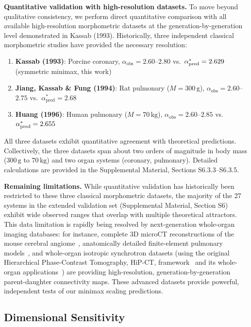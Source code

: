 \textbf{Quantitative validation with high-resolution datasets.} To move beyond
qualitative consistency, we perform direct quantitative comparison with all
available high-resolution morphometric datasets at the generation-by-generation
level demonstrated in Kassab (1993). Historically, three independent classical
morphometric studies have provided the necessary resolution:

\begin{enumerate}
    \item
\textbf{Kassab (1993)}: Porcine coronary, $\alpha_{\mathrm{obs}} = 2.60$--$2.80$
vs.\ $\alpha^*_{\mathrm{pred}} = 2.629$ (symmetric minimax, this
work)
    \item
\textbf{Jiang, Kassab \& Fung (1994)}: Rat pulmonary ($M=300\,\mathrm{g}$),
$\alpha_{\mathrm{obs}} = 2.60$--$2.75$ vs.\ $\alpha^*_{\mathrm{pred}} = 2.68$
    \item
\textbf{Huang (1996)}: Human pulmonary ($M=70\,\mathrm{kg}$),
$\alpha_{\mathrm{obs}} = 2.60$--$2.85$ vs.\ $\alpha^*_{\mathrm{pred}} =
2.655$
\end{enumerate}

All three datasets exhibit quantitative agreement with theoretical
predictions. Collectively, the three datasets span about two orders of magnitude
in body mass ($300\,\mathrm{g}$ to $70\,\mathrm{kg}$) and two organ systems
(coronary, pulmonary). Detailed calculations are provided in the Supplemental
Material, Sections S6.3.3--S6.3.5.

\textbf{Remaining limitations.} While quantitative validation has historically
been restricted to these three classical morphometric datasets, the majority of
the 27 systems in the extended validation set (Supplemental Material,
Section S6) exhibit wide observed ranges that overlap with multiple theoretical
attractors. This data limitation is rapidly being resolved by next-generation
whole-organ imaging databases: for instance, complete 3D microCT reconstructions
of the mouse cerebral angiome~\cite{quintana2019}, anatomically detailed
finite-element pulmonary models~\cite{burrowes2005}, and whole-organ isotropic
synchrotron datasets (using the original Hierarchical Phase-Contrast Tomography,
HiP-CT, framework~\cite{walsh2021} and its whole-organ
applications~\cite{chourrout2026}) are providing high-resolution,
generation-by-generation parent-daughter connectivity maps. These advanced
datasets provide powerful, independent tests of our minimax scaling predictions.

\subsection{Dimensional Sensitivity}
\label{sec:dimensional_sensitivity}

